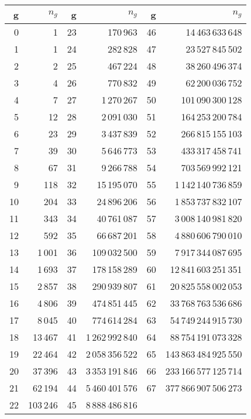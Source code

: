 \documentclass[reqno]{amsart}
\theoremstyle{plain}
\theoremstyle{definition}
\begin{document}
\begin{center}
\begin{tabular}{|r|r||r|r||r|r|}
\hline
g & $n_g$ & g & $n_g$ & g & $n_g$ \\
\hline
0 & 1 & 23 & 170\,963 & 46 & 14\,463\,633\,648\\
1 & 1 & 24 & 282\,828 & 47 & 23\,527\,845\,502\\
2 & 2 & 25 & 467\,224 & 48 & 38\,260\,496\,374\\
3 & 4 & 26 & 770\,832 & 49 & 62\,200\,036\,752\\
4 & 7 & 27 & 1\,270\,267 & 50 & 101\,090\,300\,128\\
5 & 12 & 28 & 2\,091\,030 & 51 & 164\,253\,200\,784\\
6 & 23 & 29 & 3\,437\,839 & 52 & 266\,815\,155\,103\\
7 & 39 & 30 & 5\,646\,773 & 53 & 433\,317\,458\,741\\
8 & 67 & 31 & 9\,266\,788 & 54 & 703\,569\,992\,121\\
9 & 118 & 32 & 15\,195\,070 & 55 & 1\,142\,140\,736\,859\\
10 & 204 & 33 & 24\,896\,206 & 56 & 1\,853\,737\,832\,107\\
11 & 343 & 34 & 40\,761\,087 & 57 & 3\,008\,140\,981\,820\\
12 & 592 & 35 & 66\,687\,201 & 58 & 4\,880\,606\,790\,010\\
13 & 1\,001 & 36 & 109\,032\,500 & 59 & 7\,917\,344\,087\,695\\
14 & 1\,693 & 37 & 178\,158\,289 & 60 & 12\,841\,603\,251\,351\\
15 & 2\,857 & 38 & 290\,939\,807 & 61 & 20\,825\,558\,002\,053\\
16 & 4\,806 & 39 & 474\,851\,445 & 62 & 33\,768\,763\,536\,686\\
17 & 8\,045 & 40 & 774\,614\,284 & 63 & 54\,749\,244\,915\,730\\
18 & 13\,467 & 41 & 1\,262\,992\,840 & 64 & 88\,754\,191\,073\,328\\
19 & 22\,464 & 42 & 2\,058\,356\,522 & 65 & 143\,863\,484\,925\,550\\
20 & 37\,396 & 43 & 3\,353\,191\,846 & 66 & 233\,166\,577\,125\,714\\
21 & 62\,194 & 44 & 5\,460\,401\,576 & 67 & 377\,866\,907\,506\,273\\
22 & 103\,246 & 45 & 8\,888\,486\,816 & &\\
\hline
\end{tabular}
\end{center}
\end{document}
